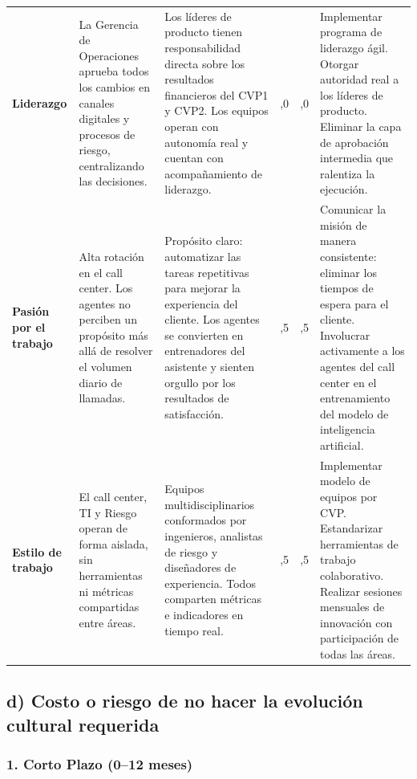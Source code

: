 \documentclass[12pt,letterpaper]{article}
\begin{document}
\begin{longtable}{%
  >{\bfseries\RaggedRight}p{2cm}
  >{\RaggedRight}p{3.2cm}
  >{\RaggedRight}p{3.6cm}
  >{\centering}p{1.1cm}
  >{\centering}p{1.5cm}
  >{\RaggedRight}p{3.4cm}}
Liderazgo &
La Gerencia de Operaciones aprueba todos los cambios en canales digitales y procesos de riesgo, centralizando las decisiones. &
Los líderes de producto tienen responsabilidad directa sobre los resultados financieros del CVP1 y CVP2. Los equipos operan con autonomía real y cuentan con acompañamiento de liderazgo. &
2,0 & 4,0 &
Implementar programa de liderazgo ágil. Otorgar autoridad real a los líderes de producto. Eliminar la capa de aprobación intermedia que ralentiza la ejecución. \\

\rowcolor{rowlightblue}
Pasión por el trabajo &
Alta rotación en el call center. Los agentes no perciben un propósito más allá de resolver el volumen diario de llamadas. &
Propósito claro: automatizar las tareas repetitivas para mejorar la experiencia del cliente. Los agentes se convierten en entrenadores del asistente y sienten orgullo por los resultados de satisfacción. &
2,5 & 4,5 &
Comunicar la misión de manera consistente: eliminar los tiempos de espera para el cliente. Involucrar activamente a los agentes del call center en el entrenamiento del modelo de inteligencia artificial. \\

Estilo de trabajo &
El call center, TI y Riesgo operan de forma aislada, sin herramientas ni métricas compartidas entre áreas. &
Equipos multidisciplinarios conformados por ingenieros, analistas de riesgo y diseñadores de experiencia. Todos comparten métricas e indicadores en tiempo real. &
1,5 & 4,5 &
Implementar modelo de equipos por CVP. Estandarizar herramientas de trabajo colaborativo. Realizar sesiones mensuales de innovación con participación de todas las áreas. \\

\end{longtable}
\endgroup

\subsection*{d) Costo o riesgo de no hacer la evolución cultural requerida}

\subsubsection*{1. Corto Plazo (0–12 meses)}
\end{document}
